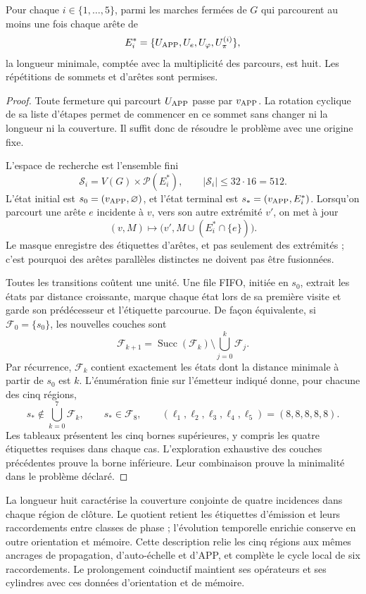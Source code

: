 \begin{theorem}
\label{regcl27:minimalidad}
Pour chaque \(i\in\{1,\ldots,5\}\), parmi les marches fermées de \(G\)
qui parcourent au moins une fois chaque arête de
\[
 E_i^*=\{U_{\rm APP},U_e,U_\varphi,U_\pi^{(i)}\},
\]
la longueur minimale, comptée avec la multiplicité des parcours, est huit.
Les répétitions de sommets et d'arêtes sont permises.
\end{theorem}

\begin{proof}
Toute fermeture qui parcourt \(U_{\rm APP}\) passe par \(v_{\rm APP}\).
La rotation cyclique de sa liste d'étapes permet de commencer en ce sommet
sans changer ni la longueur ni la couverture. Il suffit donc de résoudre le problème
avec une origine fixe.

L'espace de recherche est l'ensemble fini
\[
 \mathscr S_i=V(G)\times\mathcal P(E_i^*),
 \qquad |\mathscr S_i|\le32\cdot16=512.
\]
L'état initial est \(s_0=(v_{\rm APP},\varnothing)\), et l'état
terminal est \(s_*=(v_{\rm APP},E_i^*)\). Lorsqu'on parcourt une arête \(e\)
incidente à \(v\), vers son autre extrémité \(v'\), on met à jour
\begin{equation}
 (v,M)\longmapsto\bigl(v',M\cup(E_i^*\cap\{e\})\bigr).
 \label{regcl27:transicion-bfs}
\end{equation}
Le masque enregistre des étiquettes d'arêtes, et pas seulement des extrémités ; c'est pourquoi des arêtes parallèles distinctes ne doivent pas être fusionnées.

Toutes les transitions coûtent une unité. Une file FIFO, initiée en
\(s_0\), extrait les états par distance croissante, marque chaque état lors de
sa première visite et garde son prédécesseur et l'étiquette parcourue.
De façon équivalente, si \(\mathcal F_0=\{s_0\}\), les nouvelles couches sont
\[
 \mathcal F_{k+1}
 =\operatorname{Succ}(\mathcal F_k)
   \setminus\bigcup_{j=0}^{k}\mathcal F_j.
\]
Par récurrence, \(\mathcal F_k\) contient exactement les états dont la distance minimale à partir de \(s_0\) est \(k\). L'énumération finie sur l'émetteur indiqué donne, pour chacune des cinq régions,
\[
 s_*\notin\bigcup_{k=0}^{7}\mathcal F_k,\qquad s_*\in\mathcal F_8,
 \qquad (\ell_1,\ell_2,\ell_3,\ell_4,\ell_5)=(8,8,8,8,8).
\]
Les tableaux présentent les cinq bornes supérieures, y compris les quatre
étiquettes requises dans chaque cas. L'exploration exhaustive des
couches précédentes prouve la borne inférieure. Leur combinaison prouve la
minimalité dans le problème déclaré.
\end{proof}

La longueur huit caractérise la couverture conjointe de quatre incidences dans chaque région de clôture. Le quotient retient les étiquettes d'émission et leurs raccordements entre classes de phase ; l'évolution temporelle enrichie conserve en outre orientation et mémoire. Cette description relie les cinq régions aux mêmes ancrages de propagation, d'auto-échelle et d'APP, et complète le cycle local de six raccordements. Le prolongement coinductif maintient ses opérateurs et ses cylindres avec ces données d'orientation et de mémoire.
